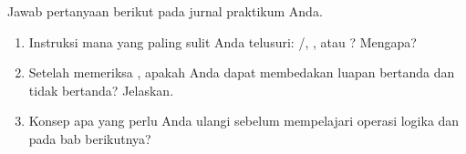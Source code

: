 \begin{refleksibox}
\vspace{1.1em}
Jawab pertanyaan berikut pada jurnal praktikum Anda.
\begin{enumerate}
    \item Instruksi mana yang paling sulit Anda telusuri:
          /, , atau ? Mengapa?
    \item Setelah memeriksa , apakah Anda dapat membedakan
          luapan bertanda dan tidak bertanda? Jelaskan.
    \item Konsep apa yang perlu Anda ulangi sebelum mempelajari
          operasi logika dan  pada bab berikutnya?
\end{enumerate}
\end{refleksibox}
